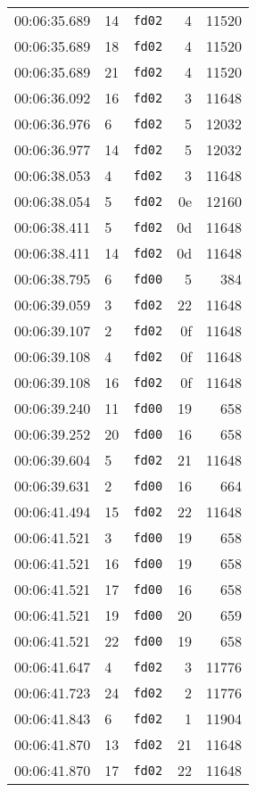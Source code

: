 \documentclass{article}
\begin{document}
\begin{longtable}{lllrr}
00:06:35.689 & 14 & \texttt{fd02} & 4 & 11520 \\
00:06:35.689 & 18 & \texttt{fd02} & 4 & 11520 \\
00:06:35.689 & 21 & \texttt{fd02} & 4 & 11520 \\
00:06:36.092 & 16 & \texttt{fd02} & 3 & 11648 \\
00:06:36.976 & 6 & \texttt{fd02} & 5 & 12032 \\
00:06:36.977 & 14 & \texttt{fd02} & 5 & 12032 \\
00:06:38.053 & 4 & \texttt{fd02} & 3 & 11648 \\
00:06:38.054 & 5 & \texttt{fd02} & 0e & 12160 \\
00:06:38.411 & 5 & \texttt{fd02} & 0d & 11648 \\
00:06:38.411 & 14 & \texttt{fd02} & 0d & 11648 \\
00:06:38.795 & 6 & \texttt{fd00} & 5 & 384 \\
00:06:39.059 & 3 & \texttt{fd02} & 22 & 11648 \\
00:06:39.107 & 2 & \texttt{fd02} & 0f & 11648 \\
00:06:39.108 & 4 & \texttt{fd02} & 0f & 11648 \\
00:06:39.108 & 16 & \texttt{fd02} & 0f & 11648 \\
00:06:39.240 & 11 & \texttt{fd00} & 19 & 658 \\
00:06:39.252 & 20 & \texttt{fd00} & 16 & 658 \\
00:06:39.604 & 5 & \texttt{fd02} & 21 & 11648 \\
00:06:39.631 & 2 & \texttt{fd00} & 16 & 664 \\
00:06:41.494 & 15 & \texttt{fd02} & 22 & 11648 \\
00:06:41.521 & 3 & \texttt{fd00} & 19 & 658 \\
00:06:41.521 & 16 & \texttt{fd00} & 19 & 658 \\
00:06:41.521 & 17 & \texttt{fd00} & 16 & 658 \\
00:06:41.521 & 19 & \texttt{fd00} & 20 & 659 \\
00:06:41.521 & 22 & \texttt{fd00} & 19 & 658 \\
00:06:41.647 & 4 & \texttt{fd02} & 3 & 11776 \\
00:06:41.723 & 24 & \texttt{fd02} & 2 & 11776 \\
00:06:41.843 & 6 & \texttt{fd02} & 1 & 11904 \\
00:06:41.870 & 13 & \texttt{fd02} & 21 & 11648 \\
00:06:41.870 & 17 & \texttt{fd02} & 22 & 11648 \\

\end{longtable}
\end{document}
